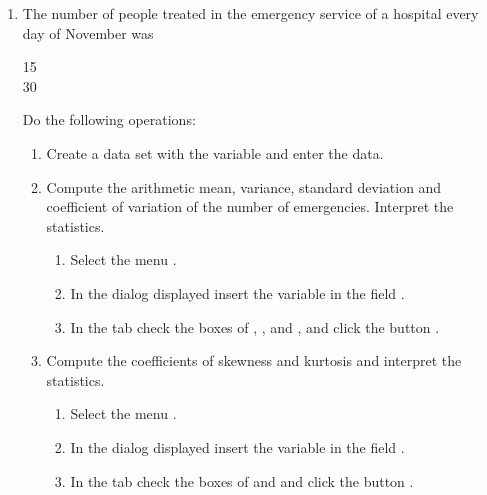 \begin{enumerate}[leftmargin=*]
\item The number of people treated in the emergency service of a hospital every day of November was
\begin{center}
15               \\
30              
\end{center}
Do the following operations: 
\begin{enumerate}
\item Create a data set with the variable  and enter the data.

\item Compute the arithmetic mean, variance, standard deviation and coefficient of variation of the number of
emergencies.
Interpret the statistics. 
\begin{indication}
\begin{enumerate}
\item Select the menu .
\item In the dialog displayed insert the variable  in the field .
\item In the  tab check the boxes of , , 
 and , and click the button .
\end{enumerate}
\end{indication}

\item Compute the coefficients of skewness and kurtosis and interpret the statistics.
\begin{indication}
\begin{enumerate}
\item Select the menu .
\item In the dialog displayed insert the variable  in the field .
\item In the  tab check the boxes of  and  and click the button .
\end{enumerate}
\end{indication}
\end{enumerate}



\end{enumerate}
